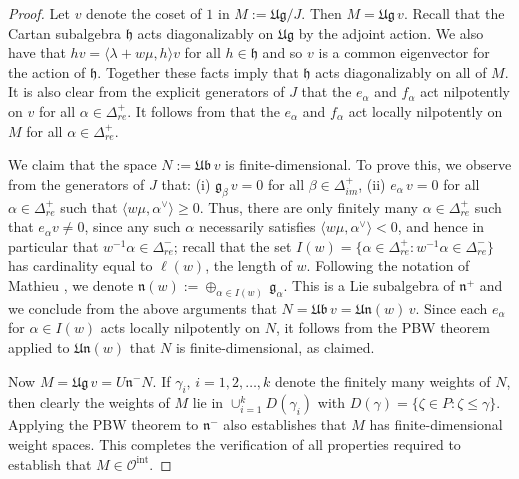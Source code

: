 \documentclass[12pt,reqno]{amsart}
\theoremstyle{plain}
\theoremstyle{definition}
\theoremstyle{remark}
\theoremstyle{plain}
\newcommand{\posreal}[1][+]{\Delta_{re}^{#1}}
\newcommand{\posimag}{\Delta_{im}^+}
\newcommand{\catoint}{\mathcal{O}^{\mathrm{int}}}
\newcommand{\lie}{\mathfrak}
\begin{document}
\begin{proof}
Let $v$ denote the coset of $1$ in $M:=\mathfrak{Ug}/J$. Then $M = \lie{Ug} \,v$. 
Recall that the Cartan subalgebra $\lie{h}$ acts diagonalizably on $\lie{Ug}$ by the adjoint action. We also have that $hv = \langle \lambda+w\mu, h\rangle v$ for all $h \in \lie h$ and so $v$ is a common eigenvector for the action of $\lie h$. Together these facts imply that $\lie{h}$ acts diagonalizably on all of $M$.
%
It is also clear from the explicit generators of $J$ that the $e_\alpha$ and $f_\alpha$ act nilpotently on $v$ for all $\alpha \in \posreal$.
%
It follows from \cite[Lemma 3.4]{Kac} that the $e_\alpha$ and $f_\alpha$ act locally nilpotently on $M$ for all $\alpha \in \posreal$.

We claim that the space $N:=\lie{Ub}\,v$ is finite-dimensional. To prove this, we observe from the generators of $J$ that: (i) ${\lie g}_\beta \,v=0$ for all $\beta \in \posimag$, (ii) $e_\alpha\, v =0$ for all $\alpha \in \posreal$ such that $\langle w\mu, \alpha^\vee \rangle \geq 0$. Thus, there are only finitely many $\alpha \in \posreal$ such that $e_\alpha v \neq 0$, since any such $\alpha$ necessarily satisfies $\langle w\mu, \alpha^\vee \rangle < 0$, and hence in particular that $w^{-1} \alpha \in \posreal[-]$; recall that the set $I(w)=\{\alpha \in \posreal: w^{-1}\alpha \in \posreal[-]\}$ has cardinality equal to $\ell(w)$, the length of $w$. Following the notation of Mathieu \cite{M1}, we denote $\mathfrak{n}(w) := \oplus_{\alpha \in I(w)} \,\lie{g}_\alpha$. This is a Lie subalgebra of $\lie n^+$ and we  conclude from the above arguments that $N=\lie{Ub}\,v = \mathfrak{Un}(w)\,v$. Since each $e_\alpha$ for $\alpha \in I(w)$ acts locally nilpotently on $N$, it follows from the PBW theorem applied to $\mathfrak{Un}(w)$ that $N$ is finite-dimensional, as claimed.

Now $M = \lie{Ug} \, v = U\lie{n}^- N$. If $\gamma_i, \,i=1, 2, \ldots, k$ denote the finitely many weights of $N$, then clearly the weights of $M$ lie in $\cup_{i=1}^k D(\gamma_i)$ with $D(\gamma) = \{\zeta \in P: \zeta \leq \gamma\}$. Applying the PBW theorem to $\lie{n}^-$ also establishes that $M$ has finite-dimensional weight spaces. This completes the verification of all properties required to establish that $M \in \catoint$.
\end{proof}


\subsection{} \label{sec:UbUg}
\end{document}
